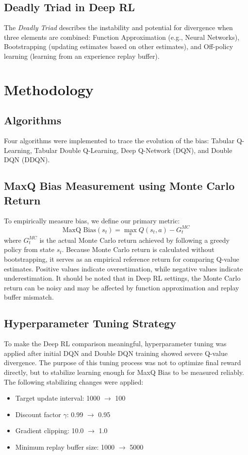 \documentclass[11pt,a4paper]{article}
\begin{document}
\subsection{Deadly Triad in Deep RL}
The \textit{Deadly Triad} describes the instability and potential for divergence when three elements are combined: Function Approximation (e.g., Neural Networks), Bootstrapping (updating estimates based on other estimates), and Off-policy learning (learning from an experience replay buffer). 

\section{Methodology}
\subsection{Algorithms}
Four algorithms were implemented to trace the evolution of the bias: Tabular Q-Learning, Tabular Double Q-Learning, Deep Q-Network (DQN), and Double DQN (DDQN).

\subsection{MaxQ Bias Measurement using Monte Carlo Return}
To empirically measure bias, we define our primary metric:
\begin{equation}
    \text{MaxQ Bias}(s_t) = \max_a Q(s_t, a) - G_t^{MC}
\end{equation}
where $G_t^{MC}$ is the actual Monte Carlo return achieved by following a greedy policy from state $s_t$. Because Monte Carlo return is calculated without bootstrapping, it serves as an empirical reference return for comparing Q-value estimates. Positive values indicate overestimation, while negative values indicate underestimation. It should be noted that in Deep RL settings, the Monte Carlo return can be noisy and may be affected by function approximation and replay buffer mismatch.

\subsection{Hyperparameter Tuning Strategy}
To make the Deep RL comparison meaningful, hyperparameter tuning was applied after initial DQN and Double DQN training showed severe Q-value divergence. The purpose of this tuning process was not to optimize final reward directly, but to stabilize learning enough for MaxQ Bias to be measured reliably. The following stabilizing changes were applied:
\begin{itemize}
    \item Target update interval: 1000 $\rightarrow$ 100
    \item Discount factor $\gamma$: 0.99 $\rightarrow$ 0.95
    \item Gradient clipping: 10.0 $\rightarrow$ 1.0
    \item Minimum replay buffer size: 1000 $\rightarrow$ 5000
\end{itemize}
\end{document}
